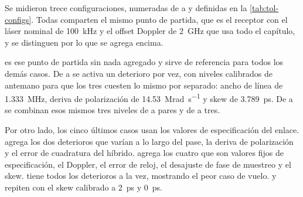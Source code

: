 Se midieron trece configuraciones, numeradas de  a  y definidas
en la \cref{tab:tol-configs}. Todas comparten el mismo punto de partida, que es
el receptor con el l\'aser nominal de \SI{100}{\kilo\hertz} y el offset
Doppler de \SI{2}{\giga\hertz} que usa todo el cap\'itulo, y se distinguen por
lo que se agrega encima.

 es ese punto de partida sin nada agregado y sirve de referencia para
todos los dem\'as casos. De  a  se activa un deterioro por vez, con
niveles calibrados de antemano para que los tres cuesten lo mismo por separado:
ancho de l\'inea de \SI{1.333}{\mega\hertz}, deriva de polarizaci\'on de
\SI{14.53}{\mega\radian\per\second} y skew de \SI{3.789}{\pico\second}. De
 a  se combinan esos mismos tres niveles de a pares y de a
tres.

Por otro lado, los cinco \'ultimos casos usan los valores de especificaci\'on del
enlace.
 agrega los dos deterioros que var\'ian a lo largo del pase, la deriva
de polarizaci\'on y el error de cuadratura del h\'ibrido.  agrega los
cuatro que son valores fijos de especificaci\'on, el Doppler, el error de
reloj, el desajuste de fase de muestreo y el skew.  tiene todos los deterioros a
la vez, mostrando el peor caso de vuelo.  y  repiten  con el
skew calibrado a \SI{2}{\pico\second} y \SI{0}{\pico\second}.

